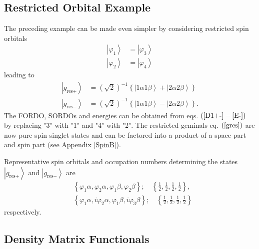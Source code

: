 \documentclass[aps,preprint]{revtex4}%
\begin{document}
\subsection{Restricted Orbital Example}

The preceding example can be made even simpler by considering restricted spin
orbitals
\begin{align}
\left\vert \varphi_{1}\right\rangle  &  =\left\vert \varphi_{3}\right\rangle
\nonumber\\
\left\vert \varphi_{2}\right\rangle  &  =\left\vert \varphi_{4}\right\rangle
\end{align}
leading to
\begin{align}
\left\vert g_{\text{res}+}\right\rangle  &  =\left(  \sqrt{2}\right)
^{-1}\left\{  \left\vert 1\alpha1\beta\right\rangle +\left\vert 2\alpha
2\beta\right\rangle \right\} \nonumber\\
\left\vert g_{\text{res}-}\right\rangle  &  =\left(  \sqrt{2}\right)
^{-1}\left\{  \left\vert 1\alpha1\beta\right\rangle -\left\vert 2\alpha
2\beta\right\rangle \right\}  . \label{gres}%
\end{align}
The FORDO, SORDOs and energies can be obtained from eqs. $\left(
\ref{D1+-}-\ref{E-}\right)  $ by replacing "3" with "1" and "4" with "2". The
restricted geminals eq. $\left(  \ref{gres}\right)  $ are now pure spin
singlet states and can be factored into a product of a space part and spin
part (see Appendix \ref{SpinB}).

Representative spin orbitals and occupation numbers determining the states
$\left\vert g_{\text{res}+}\right\rangle $ and $\left\vert g_{\text{res}%
-}\right\rangle $ are
\begin{align}
&  \left\{  \varphi_{1}\alpha,\varphi_{2}\alpha,\varphi_{1}\beta,\varphi
_{2}\beta\right\}  ;\quad\left\{  \frac{1}{2},\frac{1}{2},\frac{1}{2},\frac
{1}{2}\right\}  ,\\
&  \left\{  \varphi_{1}\alpha,i\varphi_{2}\alpha,\varphi_{1}\beta,i\varphi
_{3}\beta\right\}  ;\quad\left\{  \frac{1}{2},\frac{1}{2},\frac{1}{2},\frac
{1}{2}\right\}
\end{align}
respectively.

\subsection{Density Matrix Functionals\label{DMFEx}}
\end{document}
